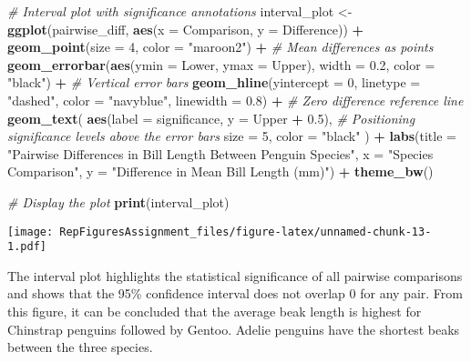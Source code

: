 \documentclass[
]{article}
\newenvironment{Shaded}{\begin{snugshade}}{\end{snugshade}}
\newcommand{\AttributeTok}[1]{\textcolor[rgb]{0.13,0.29,0.53}{#1}}
\newcommand{\CommentTok}[1]{\textcolor[rgb]{0.56,0.35,0.01}{\textit{#1}}}
\newcommand{\DecValTok}[1]{\textcolor[rgb]{0.00,0.00,0.81}{#1}}
\newcommand{\FloatTok}[1]{\textcolor[rgb]{0.00,0.00,0.81}{#1}}
\newcommand{\FunctionTok}[1]{\textcolor[rgb]{0.13,0.29,0.53}{\textbf{#1}}}
\newcommand{\NormalTok}[1]{#1}
\newcommand{\OtherTok}[1]{\textcolor[rgb]{0.56,0.35,0.01}{#1}}
\newcommand{\SpecialCharTok}[1]{\textcolor[rgb]{0.81,0.36,0.00}{\textbf{#1}}}
\newcommand{\StringTok}[1]{\textcolor[rgb]{0.31,0.60,0.02}{#1}}
\begin{document}
\begin{Shaded}
\begin{Highlighting}[]
\CommentTok{\# Interval plot with significance annotations}
\NormalTok{interval\_plot }\OtherTok{\textless{}{-}} \FunctionTok{ggplot}\NormalTok{(pairwise\_diff, }\FunctionTok{aes}\NormalTok{(}\AttributeTok{x =}\NormalTok{ Comparison, }\AttributeTok{y =}\NormalTok{ Difference)) }\SpecialCharTok{+}
  \FunctionTok{geom\_point}\NormalTok{(}\AttributeTok{size =} \DecValTok{4}\NormalTok{, }\AttributeTok{color =} \StringTok{"maroon2"}\NormalTok{) }\SpecialCharTok{+}  \CommentTok{\# Mean differences as points}
  \FunctionTok{geom\_errorbar}\NormalTok{(}\FunctionTok{aes}\NormalTok{(}\AttributeTok{ymin =}\NormalTok{ Lower, }\AttributeTok{ymax =}\NormalTok{ Upper), }\AttributeTok{width =} \FloatTok{0.2}\NormalTok{, }\AttributeTok{color =} \StringTok{"black"}\NormalTok{) }\SpecialCharTok{+} \CommentTok{\# Vertical error bars}
  \FunctionTok{geom\_hline}\NormalTok{(}\AttributeTok{yintercept =} \DecValTok{0}\NormalTok{, }\AttributeTok{linetype =} \StringTok{"dashed"}\NormalTok{, }\AttributeTok{color =} \StringTok{"navyblue"}\NormalTok{, }\AttributeTok{linewidth =} \FloatTok{0.8}\NormalTok{) }\SpecialCharTok{+}  \CommentTok{\# Zero difference reference line}
  \FunctionTok{geom\_text}\NormalTok{(}
    \FunctionTok{aes}\NormalTok{(}\AttributeTok{label =}\NormalTok{ significance, }\AttributeTok{y =}\NormalTok{ Upper }\SpecialCharTok{+} \FloatTok{0.5}\NormalTok{),  }\CommentTok{\# Positioning significance levels above the error bars}
    \AttributeTok{size =} \DecValTok{5}\NormalTok{,}
    \AttributeTok{color =} \StringTok{"black"}
\NormalTok{  ) }\SpecialCharTok{+}
  \FunctionTok{labs}\NormalTok{(}\AttributeTok{title =} \StringTok{"Pairwise Differences in Bill Length Between Penguin Species"}\NormalTok{,}
    \AttributeTok{x =} \StringTok{"Species Comparison"}\NormalTok{,}
    \AttributeTok{y =} \StringTok{"Difference in Mean Bill Length (mm)"}\NormalTok{) }\SpecialCharTok{+}
  \FunctionTok{theme\_bw}\NormalTok{()}

\CommentTok{\# Display the plot}
\FunctionTok{print}\NormalTok{(interval\_plot)}
\end{Highlighting}
\end{Shaded}

\texttt{[image: RepFiguresAssignment\_files/figure-latex/unnamed-chunk-13-1.pdf]}

The interval plot highlights the statistical significance of all
pairwise comparisons and shows that the 95\% confidence interval does
not overlap 0 for any pair. From this figure, it can be concluded that
the average beak length is highest for Chinstrap penguins followed by
Gentoo. Adelie penguins have the shortest beaks between the three
species.
\end{document}
